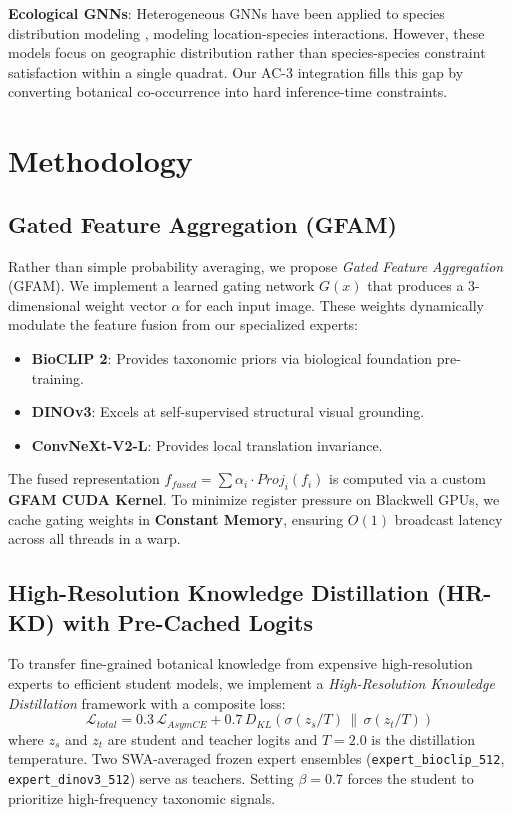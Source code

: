 \documentclass[10pt,twocolumn,letterpaper]{article}
\begin{document}
\textbf{Ecological GNNs}: Heterogeneous GNNs have been applied to species distribution modeling \cite{ecognn}, modeling location-species interactions. However, these models focus on geographic distribution rather than species-species constraint satisfaction within a single quadrat. Our AC-3 integration fills this gap by converting botanical co-occurrence into hard inference-time constraints.

\section{Methodology}

\subsection{Gated Feature Aggregation (GFAM)}
Rather than simple probability averaging, we propose \textit{Gated Feature Aggregation} (GFAM). We implement a learned gating network $G(x)$ that produces a 3-dimensional weight vector $\alpha$ for each input image. These weights dynamically modulate the feature fusion from our specialized experts:
\begin{itemize}
    \item \textbf{BioCLIP 2}: Provides taxonomic priors via biological foundation pre-training.
    \item \textbf{DINOv3}: Excels at self-supervised structural visual grounding.
    \item \textbf{ConvNeXt-V2-L}: Provides local translation invariance.
\end{itemize}
The fused representation $f_{fused} = \sum \alpha_i \cdot Proj_i(f_i)$ is computed via a custom \textbf{GFAM CUDA Kernel}. To minimize register pressure on Blackwell GPUs, we cache gating weights in \textbf{Constant Memory}, ensuring $O(1)$ broadcast latency across all threads in a warp.

\subsection{High-Resolution Knowledge Distillation (HR-KD) with Pre-Cached Logits}
To transfer fine-grained botanical knowledge from expensive high-resolution experts to efficient student models, we implement a \textit{High-Resolution Knowledge Distillation} framework with a composite loss:
\begin{equation}
    \mathcal{L}_{total} = 0.3\,\mathcal{L}_{AsymCE} + 0.7\,D_{KL}\!\left(\sigma(z_s / T) \,\|\, \sigma(z_t / T)\right)
\end{equation}
where $z_s$ and $z_t$ are student and teacher logits and $T{=}2.0$ is the distillation temperature. Two SWA-averaged frozen expert ensembles (\texttt{expert\_bioclip\_512}, \texttt{expert\_dinov3\_512}) serve as teachers. Setting $\beta{=}0.7$ forces the student to prioritize high-frequency taxonomic signals.
\end{document}
